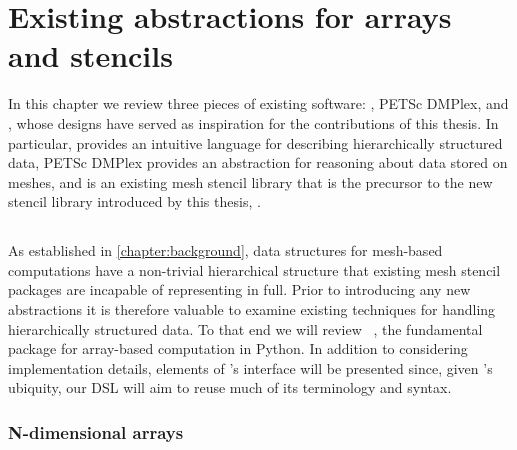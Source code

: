 \documentclass[thesis]{subfiles}
\begin{document}
\chapter{Existing abstractions for arrays and stencils}
\label{chapter:foundations}

In this chapter we review three pieces of existing software: \numpy{}, PETSc DMPlex, and , whose designs have served as inspiration for the contributions of this thesis.
In particular, \numpy{} provides an intuitive language for describing hierarchically structured data, PETSc DMPlex provides an abstraction for reasoning about data stored on meshes, and  is an existing mesh stencil library that is the precursor to the new stencil library introduced by this thesis, .

\section{\numpy{}} \label{sec:numpy}

As established in \cref{chapter:background}, data structures for mesh-based computations have a non-trivial hierarchical structure that existing mesh stencil packages are incapable of representing in full.
Prior to introducing any new abstractions it is therefore valuable to examine existing techniques for handling hierarchically structured data.
To that end we will review \numpy{}~\cite{harrisArrayProgrammingNumPy2020}, the fundamental package for array-based computation in Python.
In addition to considering implementation details, elements of \numpy{}'s interface will be presented since, given \numpy{}'s ubiquity, our DSL will aim to reuse much of its terminology and syntax.

\subsection{N-dimensional arrays} \label{sec:numpy_ndarray}
\end{document}
